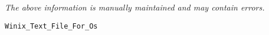 \label{pkg:file}

{\tiny \it The above information is manually maintained and may contain errors.}
\begin{verbatim}
Winix_Text_File_For_Os
\end{verbatim}
